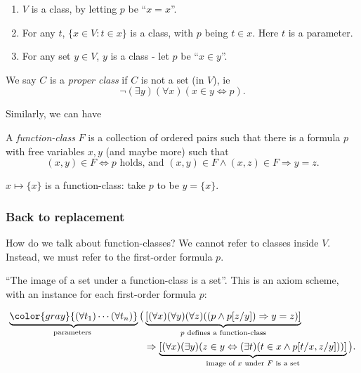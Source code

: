 \documentclass[a4paper]{article}
\begin{document}
\begin{eg}\leavevmode
  \begin{enumerate}
    \item $V$ is a class, by letting $p$ be ``$x = x$''.
    \item For any $t$, $\{x\in V: t\in x\}$ is a class, with $p$ being $t\in x$. Here $t$ is a parameter.
    \item For any set $y\in V$, $y$ is a class - let $p$ be ``$x\in y$''.
  \end{enumerate}
\end{eg}

\begin{defi}
  We say $C$ is a \emph{proper class} if $C$ is not a set (in $V$), ie
  \[
    \neg (\exists y)(\forall x)(x\in y\Leftrightarrow p).
  \]
\end{defi}

Similarly, we can have
\begin{defi}
  A \emph{function-class} $F$ is a collection of ordered pairs such that there is a formula $p$ with free variables $x, y$ (and maybe more) such that
  \[
    (x, y) \in F \Leftrightarrow p\text{ holds, and } (x, y)\in F\wedge (x, z)\in F \Rightarrow  y = z.
  \]
\end{defi}

\begin{eg}
  $x\mapsto \{x\}$ is a function-class: take $p$ to be $y = \{x\}$.
\end{eg}

\subsubsection*{Back to replacement}
How do we talk about function-classes? We cannot refer to classes inside $V$. Instead, we must refer to the first-order formula $p$.

\begin{axiom}
  ``The image of a set under a function-class is a set''. This is an axiom scheme, with an instance for each first-order formula $p$:

  \begin{align*}
   \underbrace{{\color{gray}{(\forall t_1)\cdots(\forall t_n)}}}_{\text{parameters }}\big(&\underbrace{[(\forall x)(\forall y)(\forall z)((p\wedge p[z/y])\Rightarrow y=z)]}_{p\text{ defines a function-class}}\\
   & \Rightarrow \underbrace{[(\forall x)(\exists y)(z\in y \Leftrightarrow (\exists t)(t\in x\wedge p[t/x, z/y]))]}_{\text{image of }x\text{ under }F\text{ is a set}}\big).
  \end{align*}
\end{axiom}
\end{document}
